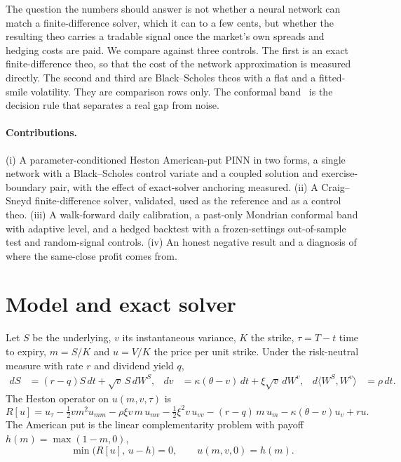 \documentclass[11pt]{article}
\begin{document}
The question the numbers should answer is not whether a neural network can match a finite-difference solver, which it can to a few cents, but whether the resulting theo carries a tradable signal once the market's own spreads and hedging costs are paid. We compare against three controls. The first is an exact finite-difference theo, so that the cost of the network approximation is measured directly. The second and third are Black--Scholes theos with a flat and a fitted-smile volatility. They are comparison rows only. The conformal band~\cite{vovk2005algorithmic,bostrom2020mondrian,gibbs2021adaptive} is the decision rule that separates a real gap from noise.

\paragraph{Contributions.}
(i) A parameter-conditioned Heston American-put PINN in two forms, a single network with a Black--Scholes control variate and a coupled solution and exercise-boundary pair, with the effect of exact-solver anchoring measured. (ii) A Craig--Sneyd finite-difference solver, validated, used as the reference and as a control theo. (iii) A walk-forward daily calibration, a past-only Mondrian conformal band with adaptive level, and a hedged backtest with a frozen-settings out-of-sample test and random-signal controls. (iv) An honest negative result and a diagnosis of where the same-close profit comes from.

\section{Model and exact solver}
Let $S$ be the underlying, $v$ its instantaneous variance, $K$ the strike, $\tau=T-t$ time to expiry, $m=S/K$ and $u=V/K$ the price per unit strike. Under the risk-neutral measure with rate $r$ and dividend yield $q$,
\begin{align}
dS &= (r-q)S\,dt+\sqrt{v}\,S\,dW^{S}, &
dv &= \kappa(\theta-v)\,dt+\xi\sqrt{v}\,dW^{v}, & d\langle W^S,W^v\rangle &= \rho\,dt.
\end{align}
The Heston operator on $u(m,v,\tau)$ is
\begin{equation}
R[u]=u_\tau-\tfrac12 v m^2u_{mm}-\rho\xi v\,m\,u_{mv}-\tfrac12\xi^2 v\,u_{vv}-(r-q)\,m\,u_m-\kappa(\theta-v)u_v+ru .
\label{eq:op}
\end{equation}
The American put is the linear complementarity problem with payoff $h(m)=\max(1-m,0)$,
\begin{equation}
\min\bigl(R[u],\,u-h\bigr)=0,\qquad u(m,v,0)=h(m).
\label{eq:lcp}
\end{equation}
\end{document}
